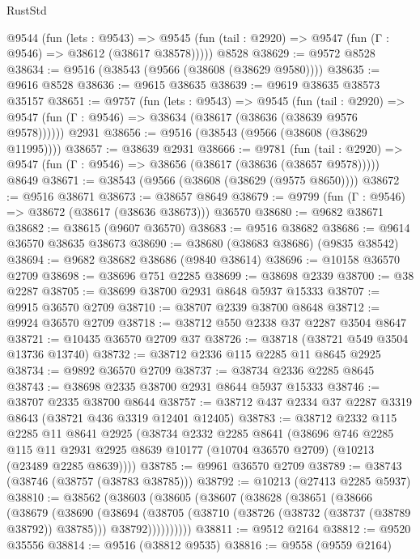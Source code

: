 \begin{lexlean}{RustStd}
\begin{coremodule}
    @9544
      (fun (lets : @9543) =>
      @9545 (fun (tail : @2920) => @9547 (fun (Γ : @9546) => @38612 (@38617 @38578)))))
    @8528
@38629 := @9572 @8528
@38634 := @9516 (@38543 (@9566 (@38608 (@38629 @9580))))
@38635 := @9616 @8528
@38636 := @9615 @38635
@38639 := @9619 @38635 @38573 @35157
@38651 := @9757
    (fun (lets : @9543) =>
    @9545
      (fun (tail : @2920) =>
      @9547 (fun (Γ : @9546) => @38634 (@38617 (@38636 (@38639 @9576 @9578))))))
    @2931
@38656 := @9516 (@38543 (@9566 (@38608 (@38629 @11995))))
@38657 := @38639 @2931
@38666 := @9781
    (fun (tail : @2920) => @9547 (fun (Γ : @9546) => @38656 (@38617 (@38636 (@38657 @9578)))))
    @8649
@38671 := @38543 (@9566 (@38608 (@38629 (@9575 @8650))))
@38672 := @9516 @38671
@38673 := @38657 @8649
@38679 := @9799 (fun (Γ : @9546) => @38672 (@38617 (@38636 @38673))) @36570
@38680 := @9682 @38671
@38682 := @38615 (@9607 @36570)
@38683 := @9516 @38682
@38686 := @9614 @36570 @38635 @38673
@38690 := @38680 (@38683 @38686) (@9835 @38542)
@38694 := @9682 @38682 @38686 (@9840 @38614)
@38696 := @10158 @36570 @2709
@38698 := @38696 @751 @2285
@38699 := @38698 @2339
@38700 := @38 @2287
@38705 := @38699 @38700 @2931 @8648 @5937 @15333
@38707 := @9915 @36570 @2709
@38710 := @38707 @2339 @38700 @8648
@38712 := @9924 @36570 @2709
@38718 := @38712 @550 @2338 @37 @2287 @3504 @8647
@38721 := @10435 @36570 @2709 @37
@38726 := @38718 (@38721 @549 @3504 @13736 @13740)
@38732 := @38712 @2336 @115 @2285 @11 @8645 @2925
@38734 := @9892 @36570 @2709
@38737 := @38734 @2336 @2285 @8645
@38743 := @38698 @2335 @38700 @2931 @8644 @5937 @15333
@38746 := @38707 @2335 @38700 @8644
@38757 := @38712 @437 @2334 @37 @2287 @3319 @8643 (@38721 @436 @3319 @12401 @12405)
@38783 := @38712
    @2332
    @115
    @2285
    @11
    @8641
    @2925
    (@38734
      @2332
      @2285
      @8641
      (@38696
        @746
        @2285
        @115
        @11
        @2931
        @2925
        @8639
        @10177
        (@10704 @36570 @2709)
        (@10213 (@23489 @2285 @8639))))
@38785 := @9961 @36570 @2709
@38789 := @38743 (@38746 (@38757 (@38783 @38785)))
@38792 := @10213 (@27413 @2285 @5937)
@38810 := @38562
    (@38603
      (@38605
        (@38607
          (@38628
            (@38651
              (@38666
                (@38679
                  (@38690
                    (@38694
                      (@38705
                        (@38710 (@38726 (@38732 (@38737 (@38789 @38792)) @38785)))
                        @38792))))))))))
@38811 := @9512 @2164
@38812 := @9520 @35556
@38814 := @9516 (@38812 @9535)
@38816 := @9558 (@9559 @2164)

\end{coremodule}
\end{lexlean}
